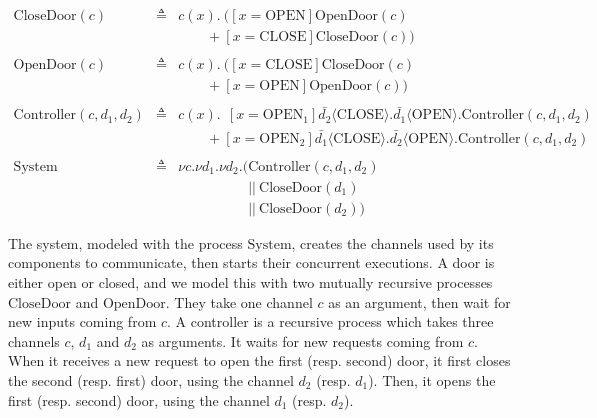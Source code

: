 \begin{example}
  \[
    \begin{array}{rcl}
      \mathrm{CloseDoor}(c)
      & \triangleq
      & c(x) . \ ([x = \mathrm{OPEN}] \mathrm{OpenDoor}(c) \\
      &
      & \qquad + [x = \mathrm{CLOSE}] \mathrm{CloseDoor}(c)) \\
      & & \\
      \mathrm{OpenDoor}(c)
      & \triangleq
      & c(x) . \ ([x = \mathrm{CLOSE}] \mathrm{CloseDoor}(c) \\
      &
      & \qquad + [x = \mathrm{OPEN}] \mathrm{OpenDoor}(c)) \\
      & & \\
      \mathrm{Controller}(c, d_1, d_2)
      & \triangleq
      & c(x). \ \ [x = \mathrm{OPEN}_1] \bar{d_2} \langle
        \mathrm{CLOSE} \rangle . \bar{d_1} \langle \mathrm{OPEN} \rangle . \mathrm{Controller}(c, d_1, d_2) \\
      &
      & \qquad + [x = \mathrm{OPEN}_2] \bar{d_1} \langle
        \mathrm{CLOSE} \rangle . \bar{d_2} \langle \mathrm{OPEN} \rangle. \mathrm{Controller}(c, d_1, d_2) \\
      & & \\
      \mathrm{System}
      & \triangleq
      & \nu c. \nu d_1. \nu d_2. (\mathrm{Controller}(c, d_1, d_2) \\
      &
      & \quad\qquad\qquad ||\ \mathrm{CloseDoor}(d_1) \\
      &
      & \quad\qquad\qquad ||\ \mathrm{CloseDoor}(d_2))
    \end{array}
  \]

  The system, modeled with the process \( \mathrm{System} \), creates the
  channels used by its components to communicate, then starts their concurrent
  executions.
  A door is either open or closed, and we model this with two mutually recursive
  processes \( \mathrm{CloseDoor} \) and \( \mathrm{OpenDoor} \).
  They take one channel \( c \) as an argument, then wait for new inputs coming
  from \( c \).
  A controller is a recursive process which takes three channels \( c \),
  \( d_1 \) and \( d_2 \) as arguments.
  It waits for new requests coming from \( c \).
  When it receives a new request to open the first (resp. second) door, it first
  closes the second (resp. first) door, using the channel \( d_2 \) (resp.
  \( d_1 \)).
  Then, it opens the first (resp. second) door, using the channel \( d_1 \)
  (resp. \( d_2 \)).
\end{example}

